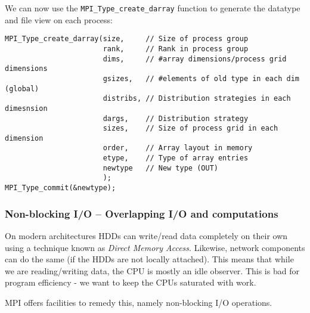 We can now use the \texttt{MPI\_Type\_create\_darray} function to generate the datatype and file view on each process:
\begin{lstlisting}
MPI_Type_create_darray(size,     // Size of process group
                       rank,     // Rank in process group
                       dims,     // #array dimensions/process grid dimensions
                       gsizes,   // #elements of old type in each dim (global)
                       distribs, // Distribution strategies in each dimesnsion
                       dargs,    // Distribution strategy
                       sizes,    // Size of process grid in each dimension
                       order,    // Array layout in memory
                       etype,    // Type of array entries
                       newtype   // New type (OUT)
                       );
MPI_Type_commit(&newtype);
\end{lstlisting}

\subsubsection{Non-blocking I/O -- Overlapping I/O and computations} %
\label{ssub:non_blocking_i_o_overlapping_i_o_and_computations}
On modern architectures HDDs can write/read data completely on their own using a technique known as \emph{Direct Memory Access}. Likewise, network components can do the same (if the HDDs are not locally attached). This means that while we are reading/writing data, the CPU is mostly an idle observer. This is bad for program efficiency - we want to keep the CPUs saturated with work.

MPI offers facilities to remedy this, namely non-blocking I/O operations.






